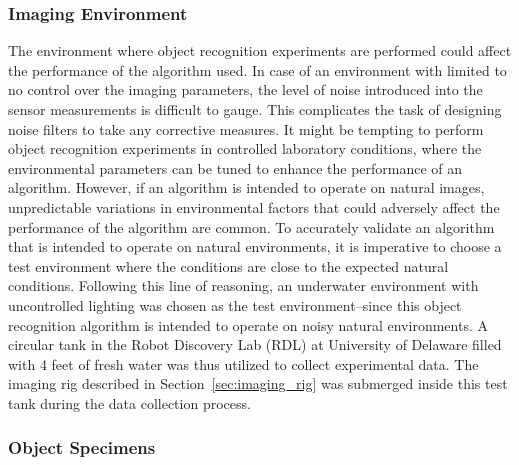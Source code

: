 \subsubsection{Imaging Environment}


The environment where object recognition experiments are performed could affect the performance of the algorithm used. In case of an environment with limited to no control over the imaging parameters, the level of noise introduced into the sensor measurements is difficult to gauge. This complicates the task of designing noise filters to take any corrective measures. It might be tempting to perform object recognition experiments in controlled laboratory conditions, where the environmental parameters can be tuned to enhance the performance of an algorithm. However, if an algorithm is intended to operate on natural images, unpredictable variations in environmental factors that could adversely affect the performance of the algorithm are common. To accurately validate an algorithm that is intended to operate on natural environments, it is imperative to choose a 
test environment where the conditions are close to the expected natural conditions. Following this line of reasoning, an underwater environment with uncontrolled lighting was chosen as the test environment--since this object recognition algorithm is intended to operate on noisy natural environments. A circular tank in the Robot Discovery Lab (RDL) at University of Delaware filled with 4 feet of fresh water was thus utilized to collect experimental data. The imaging rig described in Section~\ref{sec:imaging_rig} was submerged inside this test tank during the data collection process.

\subsubsection{Object Specimens}



